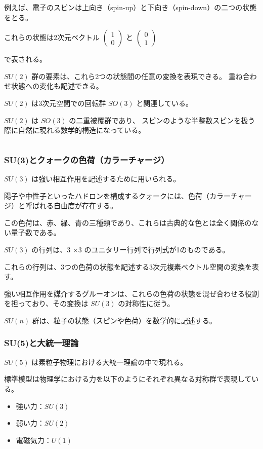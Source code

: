 \documentclass[uplatex,a4j,12pt,dvipdfmx]{jsarticle}
\begin{document}
${}$

例えば、電子のスピンは上向き（spin-up）と下向き（spin-down）の二つの状態をとる。

これらの状態は2次元ベクトル
$
	\begin{pmatrix} 1 \\
		0\end{pmatrix}
$
と
$
	\begin{pmatrix} 0 \\
		1\end{pmatrix}
$

で表される。

$SU(2)$ 群の要素は、これら2つの状態間の任意の変換を表現できる。
重ね合わせ状態への変化も記述できる。

$SU(2)$ は3次元空間での回転群 $SO(3)$ と関連している。

$SU(2)$ は $SO(3)$ の二重被覆群であり、
スピンのような半整数スピンを扱う際に自然に現れる数学的構造になっている。

${}$

\subsubsection{SU(3)とクォークの色荷（カラーチャージ）}

$SU(3)$ は強い相互作用を記述するために用いられる。

陽子や中性子といったハドロンを構成するクォークには、色荷（カラーチャージ）と呼ばれる自由度が存在する。

この色荷は、赤、緑、青の三種類であり、これらは古典的な色とは全く関係のない量子数である。

$SU(3)$ の行列は、3 $\times$3 のユニタリー行列で行列式が1のものである。

これらの行列は、3つの色荷の状態を記述する3次元複素ベクトル空間の変換を表す。

強い相互作用を媒介するグルーオンは、これらの色荷の状態を混ぜ合わせる役割を担っており、その変換は $SU(3)$ の対称性に従う。

$SU(n)$ 群は、粒子の状態（スピンや色荷）を数学的に記述する。

\subsubsection{SU(5)と大統一理論}

$SU(5)$ は素粒子物理における大統一理論の中で現れる。

標準模型は物理学における力を以下のようにそれぞれ異なる対称群で表現している。
\begin{itemize}
	\item 強い力：$SU(3)$
	\item 弱い力：$SU(2)$
	\item 電磁気力：$U(1)$
\end{itemize}
\end{document}
